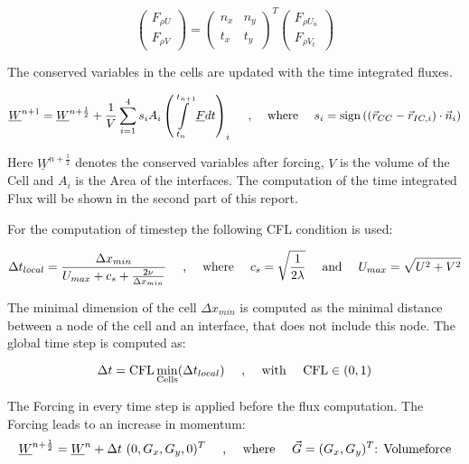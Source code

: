 \documentclass[
	pdftex,             %
	12pt,				%
	a4paper,		   	%
	english,				%
	oneside,			%
]{article}
\newcommand{\uu}[1]{\underline{#1}}
\newcommand{\vv}[1]{\vec{#1}}
\DeclareMathOperator{\sign}{sign}
\begin{document}
\begin{equation}
\begin{pmatrix} F_{\rho U} \\ F_{\rho V} \end{pmatrix}
=
\begin{pmatrix} n_x & n_y \\ t_x & t_y \end{pmatrix}^T
\begin{pmatrix} F_{\rho U_n} \\ F_{\rho V_t} \end{pmatrix}
\end{equation}

The conserved variables in the cells are updated with the time integrated fluxes.

\begin{equation}
\uu{W}^{n+1} = \uu{W}^{n+\frac{1}{2}} + \dfrac{1}{V}\sum \limits_{i=1}^4 s_i A_i \left( \int \limits_{t_n}^{t_{n+1}} \uu{F} dt  \right)_i
\textnormal{~~~~,~~~~where~~~~}
s_i = \sign \left( \left( \vv{r}_{CC} - \vv{r}_{IC, i} \right) \cdot \vv{n}_i \right)
\end{equation}

Here $\uu{W}^{n+\frac{1}{2}}$ denotes the conserved variables after forcing, $V$ is the volume of the Cell and $A_i$ is the Area of the interfaces. The computation of the time integrated Flux will be shown in the second part of this report.

For the computation of timestep the following CFL condition is used:

\begin{equation}
\Delta t_{local} = \dfrac{\Delta x_{min}}{U_{max} + c_s + \frac{2 \nu}{\Delta x_{min}}}
\textnormal{~~~~,~~~~where~~~~}
c_s = \sqrt{\frac{1}{2 \lambda}}
\textnormal{~~~~and~~~~}
U_{max} = \sqrt{U^2 + V^2}
\end{equation}

The minimal dimension of the cell $\Delta x_{min}$ is computed as the minimal distance between a node of the cell and an interface, that does not include this node. The global time step is computed as:

\begin{equation}
\Delta t = \textnormal{CFL} \min \limits_{\textnormal{Cells}}(\Delta t_{local})
\textnormal{~~~~,~~~~with~~~~}
\textnormal{CFL} \in (0, 1)
\end{equation}

The Forcing in every time step is applied before the flux computation. The Forcing leads to an increase in momentum:
\begin{equation}
\uu{W}^{n+\frac{1}{2}}
=
\uu{W}^{n} + 
\Delta t ~ (0, G_x, G_y, 0)^T
\textnormal{~~~~,~~~~where~~~~}
\vv{G} = (G_x, G_y)^T \textnormal{: Volumeforce}
\end{equation}
\end{document}
